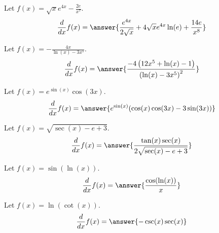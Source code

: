 \documentclass{ximera}
\begin{document}
\begin{shuffle}
\begin{exercise}
Let $f(x)=\sqrt{x} e^{4 x}-\frac{2 e}{x^7}$.
\[
\ddx f(x) = \answer{\frac{e^{4 x}}{2 \sqrt{x}}+4 \sqrt{x} e^{4 x} \ln (e)+\frac{14 e}{x^8}}
\]
\end{exercise}

\begin{exercise}
Let $f(x)=-\frac{4 x}{\ln (x)-3 x^5}$.
\[
\ddx f(x) = \answer{\frac{-4 \left(12 x^5+\ln (x)-1\right)}{\left(\ln (x)-3 x^5\right)^2}}
\]
\end{exercise}

\begin{exercise}
Let $f(x)=e^{\sin (x)} \cos (3 x)$.
\[
\ddx f(x) = \answer{e^{\sin (x)} (\cos (x) \cos (3 x)-3 \sin (3 x))}
\]
\end{exercise}

\begin{exercise}
Let $f(x)=\sqrt{\sec (x)-e+3}$.
\[
\ddx f(x) = \answer{\frac{\tan (x) \sec (x)}{2 \sqrt{\sec (x)-e+3}}}
\]
\end{exercise}

\begin{exercise}
Let $f(x)=\sin (\ln (x))$.
\[
\ddx f(x) = \answer{\frac{\cos (\ln (x))}{x}}
\]
\end{exercise}

\begin{exercise}
Let $f(x)=\ln (\cot (x))$.
\[
\ddx f(x) = \answer{-\csc (x) \sec (x)}
\]
\end{exercise}


  
\end{shuffle}
\end{document}
